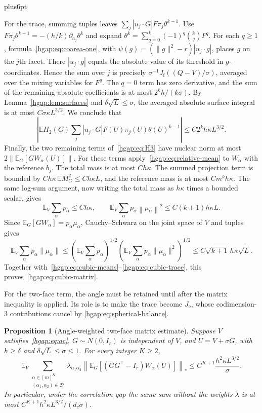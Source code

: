 \documentclass[11pt,letterpaper,twoside,leqno]{article}
\makeatletter
\theoremstyle{bookplain}
\newtheorem{proposition}{Proposition}
\theoremstyle{bookremark}
\renewenvironment{proof}[1][\proofname]{\par
  \pushQED{\qed}\normalfont\topsep6pt plus6pt\relax
  \trivlist\item[\hskip\labelsep\bfseries #1\@addpunct{.}]\ignorespaces
}{\popQED\endtrivlist\@endpefalse}
\newcommand{\E}{\mathbb E}
\newcommand{\cD}{\mathcal D}
\newcommand{\norm}[1]{\left\lVert#1\right\rVert}
\makeatother
\begin{document}
\begin{proof}
For the trace, summing tuples leaves
$\sum_j|u_j\cdot G|F\pi_j\theta^{k-1}$.
Use
$F\pi_j\theta^{k-1}=-(h/k)\partial_{a_j}\theta^k$ and expand
$\theta^k=\sum_{q=0}^k(-1)^q\binom{k}{q}F^q$.
For each $q\ge1$, formula~\eqref{hgap:eq:coarea-one}, with
$\psi(g)=(\|g\|^2-r)|u_j\cdot g|$, places $g$ on the $j$th facet.
There $|u_j\cdot g|$ equals the absolute value of its threshold in
$g$-coordinates. Hence the sum over $j$ is precisely
$\sigma^{-1}J_{\mathrm f}((Q-V)/\sigma)$, averaged over the mixing
variables for $F^q$. The $q=0$ term has zero derivative, and the sum
of the remaining absolute coefficients is at most $2^kh/(k\sigma)$.
By Lemma~\ref{hgap:lem:surfaces} and
$\delta\sqrt L\le\sigma$, the averaged absolute surface integral is
at most $C\sigma\kappa L^{3/2}$. We conclude that
\begin{equation}
 \left|\E H_2(G)\sum_j|u_j\cdot G|F(U)\pi_j(U)\theta(U)^{k-1}\right|
 \le C2^kh\kappa L^{3/2}.
 \label{hgap:eq:cubic-trace}
\end{equation}
Finally, the two remaining terms of~\eqref{hgap:eq:H3} have nuclear norm
at most $2\norm{\E_G[G W_\alpha(U)]}$.
For these terms apply~\eqref{hgap:eq:relative-mean} to $W_\alpha$
with the reference $b_j$. The total mass is at most $Ch\kappa$.
The summed projection term is bounded by
$Ch\kappa\,\E M_G^2\le Ch\kappa L$, and the reference mass is at
most $Cm^kh\kappa$. The same log-sum argument, now writing the
total mass as $h\kappa$ times a bounded scalar, gives
\[
 \E_V\sum_\alpha p_\alpha\le Ch\kappa,\qquad
 \E_V\sum_\alpha p_\alpha\norm{\mu_\alpha}^2
 \le C(k+1)h\kappa L.
\]
Since $\E_G[GW_\alpha]=p_\alpha\mu_\alpha$, Cauchy--Schwarz on the
joint space of $V$ and tuples gives
\[
 \E_V\sum_\alpha p_\alpha\|\mu_\alpha\|
 \le\left(\E_V\sum_\alpha p_\alpha\right)^{1/2}
      \left(\E_V\sum_\alpha p_\alpha\|\mu_\alpha\|^2\right)^{1/2}
 \le C\sqrt{k+1}\,h\kappa\sqrt L.
\]
Together with~\eqref{hgap:eq:cubic-means}--\eqref{hgap:eq:cubic-trace}, this
proves~\eqref{hgap:eq:cubic-matrix}.
\end{proof}

For the two-face term, the angle must be retained until after the
matrix inequality is applied. Its role is to make the trace become
$J_{\mathrm e}$, whose codimension-$3$ contributions cancel by
\eqref{hgap:eq:spherical-balance}.

\begin{proposition}[Angle-weighted two-face matrix estimate]\label{hgap:prop:pair}
Suppose $V$ satisfies~\eqref{hgap:eq:ac}, $G\sim N(0,I_r)$ is
independent of $V$, and $U=V+\sigma G$, with
$h\ge\delta$ and $\delta\sqrt L\le\sigma\le1$.
For every integer $K\ge2$,
\begin{equation}
 \E_V\sum_{\substack{\alpha\in[m]^K\\(\alpha_1,\alpha_2)\in\cD}}
 \lambda_{\alpha_1\alpha_2}
 \left\|\E_G[(GG^\top-I_r)W_\alpha(U)]\right\|_*
 \le C^{K+1}\frac{h^2\kappa L^{3/2}}{\sigma}.
 \label{hgap:eq:weighted-pair-matrix}
\end{equation}
In particular, under the correlation gap the same sum without the
weights $\lambda$ is at most $C^{K+1}h^2\kappa L^{3/2}/(d_c\sigma)$.
\end{proposition}
\end{document}
